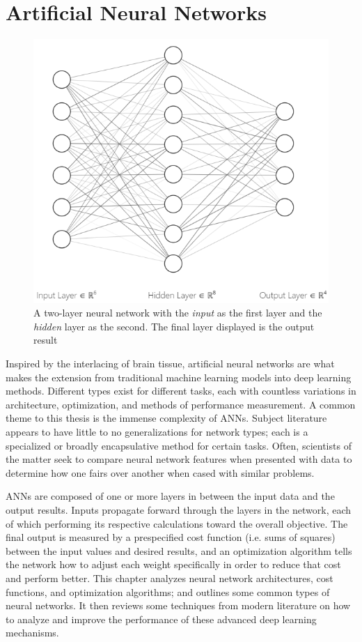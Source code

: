 \chapter{Artificial Neural Networks}

\begin{figure}
  \vspace{-20pt}
    \centering
    \includegraphics[width=.37\textwidth]{Figures/NN_int.png}
    \caption{\footnotesize{A two-layer neural network with the \emph{input} as the first layer and the \emph{hidden} layer as the second.  The final layer displayed is the output result}}
  \label{NNet}
  \vspace{-17pt}
\end{figure}

Inspired by the interlacing of brain tissue, artificial neural networks are what makes the extension from traditional machine learning models into deep learning methods.  Different types exist for different tasks, each with countless variations in architecture, optimization, and methods of performance measurement. A common theme to this thesis is the immense complexity of ANNs. Subject literature appears to have little to no generalizations for network types; each is a specialized or broadly encapsulative method for certain tasks.  Often, scientists of the matter seek to compare neural network features when presented with data to determine how one fairs over another when cased with similar problems. \cite{nusrat2018comparison} \cite{sharma2017activation} \cite{8371683}

ANNs are composed of one or more layers in between the input data and the output results.  Inputs propagate forward through the layers in the network, each of which performing its respective calculations toward the overall objective.  The final output is measured by a prespecified cost function (i.e. sums of squares) between the input values and desired results, and an optimization algorithm tells the network how to adjust each weight specifically in order to reduce that cost and perform better.  This chapter analyzes neural network architectures, cost functions, and  optimization algorithms; and outlines some common types of neural networks. It then reviews some techniques from modern literature on how to analyze and improve the performance of these advanced deep learning mechanisms.


